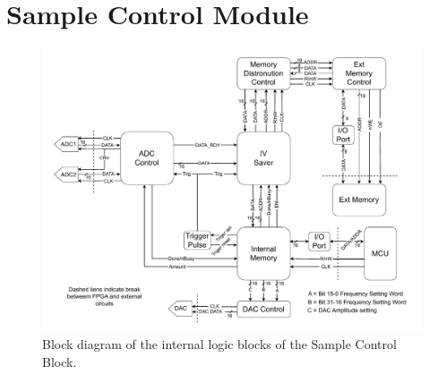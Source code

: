 \section{Sample Control Module} \label{sec:SampleControl}

\begin{figure}[H]
    \centering
    \includegraphics[clip, trim=0 0 0 0, width=1\textwidth]{Sections/7_SystemDesign/Figures/Sample_Control_Block.pdf}
    \caption{Block diagram of the internal logic blocks of the Sample Control Block.}
    \label{fig:7_SampleControlBlock}
\end{figure}